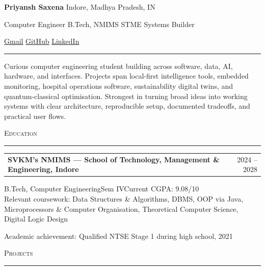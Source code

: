 \documentclass[10pt, a4paper]{article}
\newcommand{\rsection}[1]{%
  \vspace{7pt}%
  {\small\scshape\color{muted}#1}%
  \vspace{2pt}\par\noindent%
  {\color{ruled}\rule{\linewidth}{0.4pt}}\par%
  \vspace{2pt}%
}
\begin{document}

{\LARGE\bfseries Priyansh Saxena}
\hfill
{\small\color{muted}Indore, Madhya Pradesh, IN}

\vspace{4pt}
{\color{mid}
  Computer Engineer
  \enspace\textperiodcentered\enspace
  B.Tech, NMIMS STME
  \enspace\textperiodcentered\enspace
  Systems Builder
}

\vspace{4pt}
{\small\color{muted}
  \href{mailto:priyanshsaxena50@gmail.com}{Gmail}
  \quad\textbar\quad
  \href{https://github.com/PriyanshS}{GitHub}
  \quad\textbar\quad
  \href{https://www.linkedin.com/in/priyansh-saxena-027a40317}{LinkedIn}
}

\vspace{5pt}
{\color{ruled}\rule{\linewidth}{0.5pt}}
\vspace{4pt}

{\small\color{mid}
Curious computer engineering student building across software, data, AI, hardware,
and interfaces. Projects span local-first intelligence tools, embedded monitoring,
hospital operations software, sustainability digital twins, and quantum-classical
optimisation. Strongest in turning broad ideas into working systems with clear
architecture, reproducible setup, documented tradeoffs, and practical user flows.
}

\rsection{Education}

\noindent
\begin{tabularx}{\linewidth}{@{}X r@{}}
  \textbf{SVKM's NMIMS --- School of Technology, Management \& Engineering, Indore}
  & {\small\color{muted}2024 -- 2028} \\
\end{tabularx}
{\small\color{mid}B.Tech, Computer Engineering\quad\textperiodcentered\quad Sem IV\quad\textperiodcentered\quad Current CGPA: 9.08/10}\\
{\footnotesize\color{muted}
  Relevant coursework: Data Structures \& Algorithms, DBMS, OOP via Java,
  Microprocessors \& Computer Organisation, Theoretical Computer Science, Digital Logic Design
}

{\footnotesize\color{muted}
  Academic achievement: Qualified NTSE Stage 1 during high school, 2021
}

\rsection{Projects}
\end{document}

